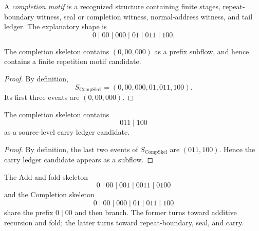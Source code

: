\begin{definition}
\label{def:case-studies-completion-motif}
A \emph{completion motif} is a recognized structure containing finite stages, repeat-boundary witness, seal or completion witness, normal-address witness, and tail ledger. The explanatory shape is
$$
  0\mid 00\mid 000\mid 01\mid 011\mid 100.
$$
\end{definition}

\begin{proposition}
\label{prop:case-studies-completion-contains-repetition}
The completion skeleton contains $(0,00,000)$ as a prefix subflow, and hence contains a finite repetition motif candidate.
\end{proposition}

\begin{proof}
By definition,
$$
  S_{\mathrm{CompSkel}}=(0,00,000,01,011,100).
$$
Its first three events are $(0,00,000)$.
\end{proof}

\begin{proposition}
\label{prop:case-studies-completion-contains-carry}
The completion skeleton contains
$$
  011\mid 100
$$
as a source-level carry ledger candidate.
\end{proposition}

\begin{proof}
By definition, the last two events of $S_{\mathrm{CompSkel}}$ are $(011,100)$. Hence the carry ledger candidate appears as a subflow.
\end{proof}

\begin{corollary}
\label{cor:case-studies-completion-splits-from-fold}
The Add and fold skeleton
$$
  0\mid 00\mid 001\mid 0011\mid 0100
$$
and the Completion skeleton
$$
  0\mid 00\mid 000\mid 01\mid 011\mid 100
$$
share the prefix $0\mid 00$ and then branch. The former turns toward additive recursion and fold; the latter turns toward repeat-boundary, seal, and carry.
\end{corollary}

